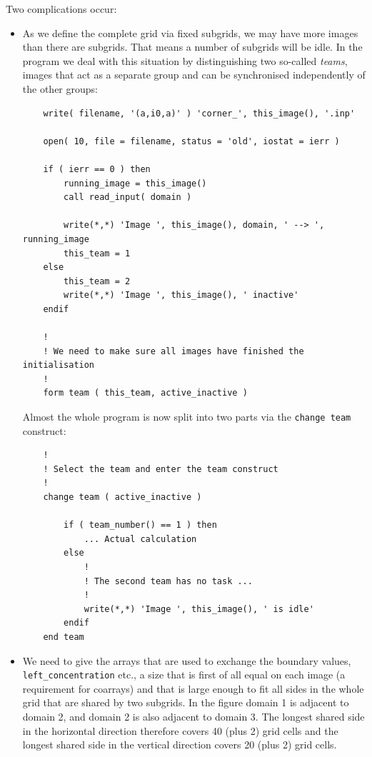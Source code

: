 \documentclass[onecolumn]{article}
\begin{document}
Two complications occur:
\begin{itemize}
\item
As we define the complete grid via fixed subgrids, we may have more images than there are subgrids. That means a number of subgrids will be
idle. In the program we deal with this situation by distinguishing two so-called \emph{teams}, images that act as a separate group and can be
synchronised independently of the other groups:

\begin{lstlisting}
    write( filename, '(a,i0,a)' ) 'corner_', this_image(), '.inp'

    open( 10, file = filename, status = 'old', iostat = ierr )

    if ( ierr == 0 ) then
        running_image = this_image()
        call read_input( domain )

        write(*,*) 'Image ', this_image(), domain, ' --> ', running_image
        this_team = 1
    else
        this_team = 2
        write(*,*) 'Image ', this_image(), ' inactive'
    endif

    !
    ! We need to make sure all images have finished the initialisation
    !
    form team ( this_team, active_inactive )
\end{lstlisting}

Almost the whole program is now split into two parts via the \verb+change team+ construct:
\begin{lstlisting}
    !
    ! Select the team and enter the team construct
    !
    change team ( active_inactive )

        if ( team_number() == 1 ) then
            ... Actual calculation
        else
            !
            ! The second team has no task ...
            !
            write(*,*) 'Image ', this_image(), ' is idle'
        endif
    end team
\end{lstlisting}

\item
We need to give the arrays that are used to exchange the boundary values, \verb+left_concentration+ etc., a size that is first of all equal on
each image (a requirement for coarrays) and that is large enough to fit all sides in the whole grid that are shared by two subgrids. In the
figure domain 1 is adjacent to domain 2, and domain 2 is also adjacent to domain 3. The longest shared side in the horizontal direction therefore
covers 40 (plus 2) grid cells and the longest shared side in the vertical direction covers 20 (plus 2) grid cells.


\end{itemize}
\end{document}
